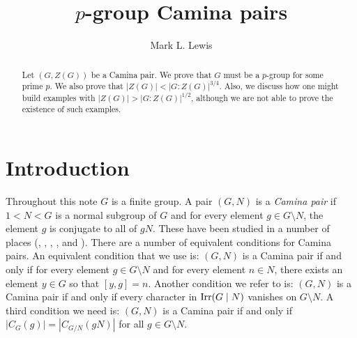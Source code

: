 

\usepackage{amssymb,amsthm}
\usepackage{amsmath}

\newtheorem{thm}{Theorem}
\newtheorem{cor}[thm]{Corollary}
\newtheorem{theorem}{Theorem}[section]
\newtheorem{corollary}[theorem]{Corollary}
\newtheorem{proposition}[theorem]{Proposition}
\newtheorem{lemma}[theorem]{Lemma}
\newtheorem{hypothesis}[theorem]{Hypothesis}

\raggedbottom



\title{$p$-group Camina pairs}

\author{Mark L. Lewis}

\address{Department of Mathematical Sciences, Kent State University, Kent, OH 44242}



\begin{abstract}
Let $(G,Z(G))$ be a Camina pair.  We prove that $G$ must be a $p$-group for some prime $p$.  We also prove that $|Z(G)| < |G:Z(G)|^{3/4}$.  Also, we discuss how one might build examples with $|Z(G)| > |G:Z(G)|^{1/2}$, although we are not able to prove the existence of such examples.
\end{abstract}

\maketitle

\section{Introduction}

Throughout this note $G$ is a finite group.  A pair $(G,N)$ is a {\it Camina pair} if $1 < N < G$ is a normal subgroup of $G$ and for every element $g \in G \setminus N$, the element $g$ is conjugate to all of $gN$.  These have been studied in a number of places (\cite{Camina}, \cite{ChMc}, \cite{ChMaSc}, \cite{coprime}, and \cite{sylow}).  There are a number of equivalent conditions for Camina pairs.  An equivalent condition that we use is: $(G,N)$ is a Camina pair if and only if for every element $g \in G \setminus N$ and for every element $n \in N$, there exists an element $y \in G$ so that $[y,g] = n$.  Another condition we refer to is: $(G,N)$ is a Camina pair if and only if every character in ${{\rm  Irr}({G \mid N})}$ vanishes on $G \setminus N$.  A third condition we need is: $(G,N)$ is a Camina pair if and only if $|C_G (g)| = |C_{G/N} (gN)|$ for all $g \in G \setminus N$.

